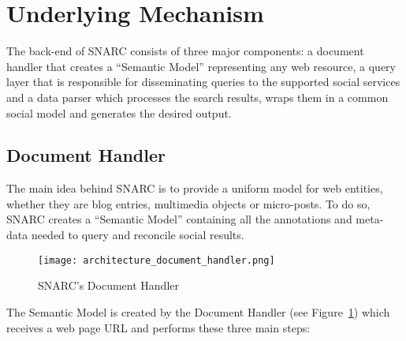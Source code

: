 \section{Underlying Mechanism}

The back-end of SNARC consists of three major components: a document handler that creates a ``Semantic Model'' representing any web resource, a query layer that is responsible for disseminating queries to the supported social services and a data parser which processes the search results, wraps them in a common social model and generates the desired output.

\subsection{Document Handler}
The main idea behind SNARC is to provide a uniform model for web entities, whether they are blog entries, multimedia objects or micro-posts. To do so, SNARC creates a ``Semantic Model'' containing all the annotations and meta-data needed to query and reconcile social results.

\begin{figure}[!ht]
  \centering
    \texttt{[image: architecture\_document\_handler.png]}
  \caption{SNARC's Document Handler}
  \label{fig:architecture_document_handler}
\end{figure}

The Semantic Model is created by the Document Handler (see Figure~\ref{fig:architecture_document_handler}) which receives a web page URL and performs these three main steps:


